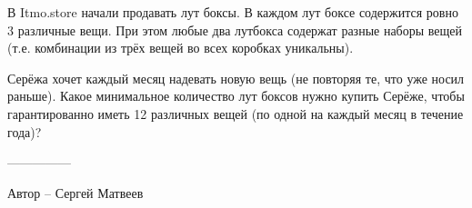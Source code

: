 \question
В Itmo.store начали продавать лут боксы. В каждом лут боксе содержится ровно 3 различные вещи. При этом любые два лутбокса содержат разные наборы вещей (т.е. комбинации из трёх вещей во всех коробках уникальны).

Серёжа хочет каждый месяц надевать новую вещь (не повторяя те, что уже носил раньше). Какое минимальное количество лут боксов нужно купить Серёже, чтобы гарантированно иметь 12 различных вещей (по одной на каждый месяц в течение года)?

---------------

Автор -- Сергей Матвеев
